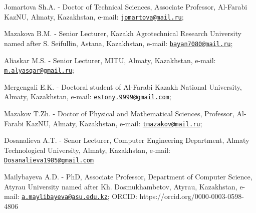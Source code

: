 \begin{authorinfo}
Jomartova Sh.A. - Doctor of Technical Sciences, Associate Professor,
Al-Farabi KazNU, Almaty, Kazakhstan, e-mail:
\href{mailto:jomartova@mail.ru}{\nolinkurl{jomartova@mail.ru}};

Mazakova B.M. - Senior Lecturer, Kazakh Agrotechnical Research
University named after S. Seifullin, Astana, Kazakhstan, e-mail:
\href{mailto:bayan7080@mail.ru}{\nolinkurl{bayan7080@mail.ru}};

Aliaskar M.S. - Senior Lecturer, MITU, Almaty, Kazakhstan, e-mail:
\href{mailto:m.alyasqar@gmail.ru}{\nolinkurl{m.alyasqar@gmail.ru}};

Mergengali E.K. - Doctoral student of Al-Farabi Kazakh National
University, Almaty, Kazakhstan, e-mail:
\href{mailto:estony.9999@gmail.com}{\nolinkurl{estony.9999@gmail.com}};

Mazakov T.Zh. - Doctor of Physical and Mathematical Sciences, Professor,
Al-Farabi KazNU, Almaty, Kazakhstan, e-mail:
\href{mailto:tmazakov@mail.ru}{\nolinkurl{tmazakov@mail.ru}};

Dosanalieva A.T. - Senor Lecturer, Computer Engineering Department,
Almaty Technological University, Almaty, Kazakhstan, e-mail:
\href{mailto:Dosanalieva1985@gmail.com}{\nolinkurl{Dosanalieva1985@gmail.com}}

Mailybayeva A.D. - PhD, Associate Professor, Department of Computer
Science, Atyrau University named after Kh. Dosmukhambetov, Atyrau,
Kazakhstan, e-mail:
\href{mailto:a.maylibayeva@asu.edu.kz}{\nolinkurl{a.maylibayeva@asu.edu.kz}};
ORCID: https://orcid.org/0000-0003-0598-4806
\end{authorinfo}
